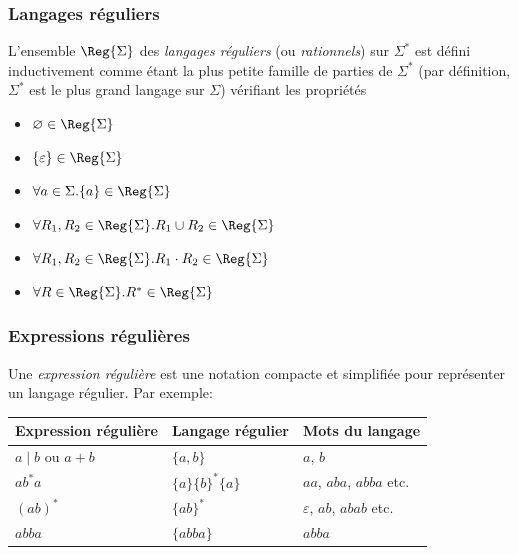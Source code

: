 %
\begin{frame}
\frametitle{Langages réguliers}

L'ensemble $\Reg{\Sigma}$ des \emph{langages réguliers} (ou
\emph{rationnels}) sur $\Sigma^{*}$ est défini inductivement comme
étant la plus petite famille de parties de $\Sigma^{*}$ (par
définition, $\Sigma^{*}$ est le plus grand langage sur $\Sigma$)
vérifiant les propriétés
\begin{itemize}

  \item $\varnothing \in \Reg{\Sigma}$

  \item $\{\varepsilon\} \in \Reg{\Sigma}$

  \item $\forall a \in \Sigma.\{a\} \in \Reg{\Sigma}$

  \item $\forall R_1, R_2 \in \Reg{\Sigma}.R_1 \cup R_2 \in
  \Reg{\Sigma}$

  \item $\forall R_1, R_2 \in \Reg{\Sigma}.R_1 \cdot R_2 \in
  \Reg{\Sigma}$

  \item $\forall R \in \Reg{\Sigma}.R^{*} \in \Reg{\Sigma}$

\end{itemize}


\end{frame}

%
\begin{frame}
\frametitle{Expressions régulières}

Une \emph{expression régulière} est une notation compacte et
simplifiée pour représenter un langage régulier. Par exemple:

\bigskip

\begin{center}
\begin{tabular}{l|l|l}
    \textbf{Expression régulière}
  & \textbf{Langage régulier}
  & \textbf{Mots du langage}\\
     \hline
    $a \mid b$ ou $a + b$
  & $\{a, b\}$
  & $a$, $b$\\
    $ab^{*}a$
  & $\{a\}\{b\}^{*}\{a\}$
  & $aa$, $aba$, $abba$ etc.\\
    $(ab)^{*}$
  & $\{ab\}^{*}$
  & $\varepsilon$, $ab$, $abab$ etc.\\
    $abba$
  & $\{abba\}$
  & $abba$
\end{tabular}
\end{center}

\end{frame}

